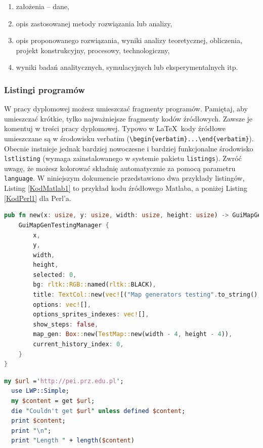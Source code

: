 \documentclass[12pt,twoside]{article}
\begin{document}
\begin{enumerate}[label=\alph*), leftmargin=1.25cm] 
	\item założenia – dane,
	\item opis zastosowanej metody rozwiązania lub analizy,
	\item opis proponowanego rozwiązania, wyniki analizy teoretycznej, obliczenia, projekt konstrukcyjny, procesowy, technologiczny,
	\item wyniki badań analitycznych, symulacyjnych lub eksperymentalnych itp.
\end{enumerate}





{\subsubsection{Listingi programów}}

W pracy dyplomowej możesz umieszczać fragmenty programów. Pamiętaj, aby umieszczać krótkie, tylko najważniejsze fragmenty kodów źródłowych. Zawsze je komentuj w treści
pracy dyplomowej. Typowo w \LaTeX\ kody źródłowe umieszczane są w środowisku verbatim (\verb|\begin{verbatim}...\end{verbatim}|). Obecnie instnieje jednak bardziej nowoczesne i bardziej funkcjonalne środowisko \verb|lstlisting| (wymaga zainstalowanego w systemie pakietu \verb|listings|). Zwróć uwagę, że możesz kolorować składnię
automatycznie za pomocą parametru \verb|language|. W niniejszym dokumencie przedstawiono dwa przykłady listingów, Listing \ref{KodMatlab1} to przykład kodu źródłowego Matlaba, a poniżej Listing \ref{KodPerl1} dla Perl'a.\\


\begin{lstlisting}[language=Rust,caption=Listing programu Matlab,label={KodMatlab1}]
pub fn new(x: usize, y: usize, width: usize, height: usize) -> GuiMapGenTestingManager {
	GuiMapGenTestingManager {
		x,
		y,
		width,
		height,
		selected: 0,
		bg: rltk::RGB::named(rltk::BLACK),
		title: TextCol::new(vec![("Map generators testing".to_string(),rltk::RGB::named(rltk::WHITE))]),
		options: vec![],
		options_sprites_indexes: vec![],
		show_steps: false,
		map_gen: Box::new(TestMap::new(width - 4, height - 4)),
		current_history_index: 0,
	}
}
\end{lstlisting}

\begin{lstlisting}[language=Perl,caption=Listing programu Perl,label={KodPerl1}]
  my $url ='http://pei.prz.edu.pl';
  use LWP::Simple;
  my $content = get $url;
  die "Couldn't get $url" unless defined $content;
  print $content;
  print "\n";
  print "Length " + length($content)
\end{lstlisting}
\end{document}
